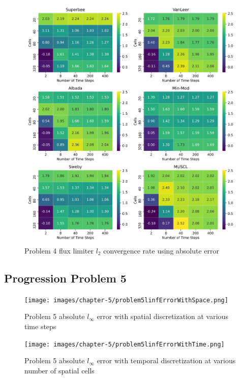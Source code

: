 \begin{figure}[p]
    \centering
    \includegraphics[width=6in]{images/chapter-5/problem4l2FluxLimiterConvergenceRate.png}
    \caption{Problem 4 flux limiter $l_{2}$ convergence rate using absolute error}
    \label{fig:problem4_l2error_fluxlimiter_convergence_rate}
\end{figure}

\clearpage

\subsection{Progression Problem 5}
\begin{figure}[p]
    \centering
    \texttt{[image: images/chapter-5/problem5linfErrorWithSpace.png]}
    \caption{Problem 5 absolute $l_{\infty}$ error with spatial discretization at various time steps }
    \label{fig:problem5_linferror_spatial_results}
\end{figure}

\clearpage

\begin{figure}[p]
    \centering
    \texttt{[image: images/chapter-5/problem5linfErrorWithTime.png]}
    \caption{Problem 5 absolute $l_{\infty}$ error with temporal discretization at various number of spatial cells}
    \label{fig:problem5_linferror_time_results}
\end{figure}


